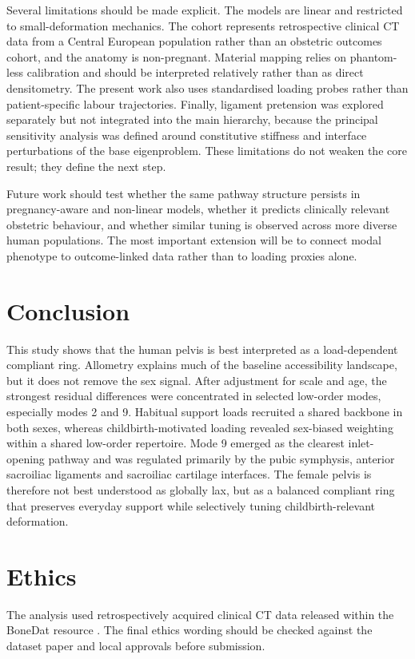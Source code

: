 \documentclass[openacc]{rsproca_new}
\begin{document}
Several limitations should be made explicit. The models are linear and restricted to small-deformation mechanics. The cohort represents retrospective clinical CT data from a Central European population rather than an obstetric outcomes cohort, and the anatomy is non-pregnant. Material mapping relies on phantom-less calibration and should be interpreted relatively rather than as direct densitometry. The present work also uses standardised loading probes rather than patient-specific labour trajectories. Finally, ligament pretension was explored separately but not integrated into the main hierarchy, because the principal sensitivity analysis was defined around constitutive stiffness and interface perturbations of the base eigenproblem. These limitations do not weaken the core result; they define the next step.

Future work should test whether the same pathway structure persists in pregnancy-aware and non-linear models, whether it predicts clinically relevant obstetric behaviour, and whether similar tuning is observed across more diverse human populations. The most important extension will be to connect modal phenotype to outcome-linked data rather than to loading proxies alone.

\section{Conclusion}
This study shows that the human pelvis is best interpreted as a load-dependent compliant ring. Allometry explains much of the baseline accessibility landscape, but it does not remove the sex signal. After adjustment for scale and age, the strongest residual differences were concentrated in selected low-order modes, especially modes 2 and 9. Habitual support loads recruited a shared backbone in both sexes, whereas childbirth-motivated loading revealed sex-biased weighting within a shared low-order repertoire. Mode 9 emerged as the clearest inlet-opening pathway and was regulated primarily by the pubic symphysis, anterior sacroiliac ligaments and sacroiliac cartilage interfaces. The female pelvis is therefore not best understood as globally lax, but as a balanced compliant ring that preserves everyday support while selectively tuning childbirth-relevant deformation.

\section*{Ethics}
The analysis used retrospectively acquired clinical CT data released within the BoneDat resource \cite{hen2025}. The final ethics wording should be checked against the dataset paper and local approvals before submission.
\end{document}
